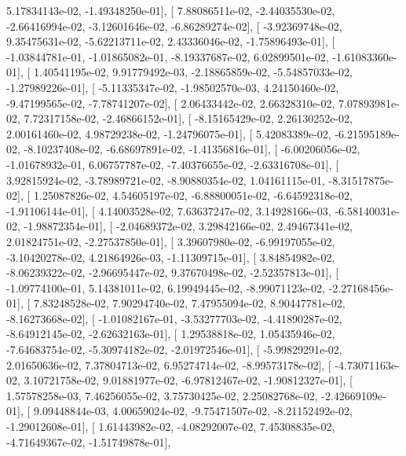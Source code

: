 \documentclass{article}
\begin{document}
          5.17834143e-02,  -1.49348250e-01],
       [  7.88086511e-02,  -2.44035530e-02,  -2.66416994e-02,
         -3.12601646e-02,  -6.86289274e-02],
       [ -3.92369748e-02,   9.35475631e-02,  -5.62213711e-02,
          2.43336046e-02,  -1.75896493e-01],
       [ -1.03844781e-01,  -1.01865082e-01,  -8.19337687e-02,
          6.02899501e-02,  -1.61083360e-01],
       [  1.40541195e-02,   9.91779492e-03,  -2.18865859e-02,
         -5.54857033e-02,  -1.27989226e-01],
       [ -5.11335347e-02,  -1.98502570e-03,   4.24150460e-02,
         -9.47199565e-02,  -7.78741207e-02],
       [  2.06433442e-02,   2.66328310e-02,   7.07893981e-02,
          7.72317158e-02,  -2.46866152e-01],
       [ -8.15165429e-02,   2.26130252e-02,   2.00161460e-02,
          4.98729238e-02,  -1.24796075e-01],
       [  5.42083389e-02,  -6.21595189e-02,  -8.10237408e-02,
         -6.68697891e-02,  -1.41356816e-01],
       [ -6.00206056e-02,  -1.01678932e-01,   6.06757787e-02,
         -7.40376655e-02,  -2.63316708e-01],
       [  3.92815924e-02,  -3.78989721e-02,  -8.90880354e-02,
          1.04161115e-01,  -8.31517875e-02],
       [  1.25087826e-02,   4.54605197e-02,  -6.88800051e-02,
         -6.64592318e-02,  -1.91106144e-01],
       [  4.14003528e-02,   7.63637247e-02,   3.14928166e-03,
         -6.58140031e-02,  -1.98872354e-01],
       [ -2.04689372e-02,   3.29842166e-02,   2.49467341e-02,
          2.01824751e-02,  -2.27537850e-01],
       [  3.39607980e-02,  -6.99197055e-02,  -3.10420278e-02,
          4.21864926e-03,  -1.11309715e-01],
       [  3.84854982e-02,  -8.06239322e-02,  -2.96695447e-02,
          9.37670498e-02,  -2.52357813e-01],
       [ -1.09774100e-01,   5.14381011e-02,   6.19949445e-02,
         -8.99071123e-02,  -2.27168456e-01],
       [  7.83248528e-02,   7.90294740e-02,   7.47955094e-02,
          8.90447781e-02,  -8.16273668e-02],
       [ -1.01082167e-01,  -3.53277703e-02,  -4.41890287e-02,
         -8.64912145e-02,  -2.62632163e-01],
       [  1.29538818e-02,   1.05435946e-02,  -7.64683754e-02,
         -5.30974182e-02,  -2.01972546e-01],
       [ -5.99829291e-02,   2.01650636e-02,   7.37804713e-02,
          6.95274714e-02,  -8.99573178e-02],
       [ -4.73071163e-02,   3.10721758e-02,   9.01881977e-02,
         -6.97812467e-02,  -1.90812327e-01],
       [  1.57578258e-03,   7.46256055e-02,   3.75730425e-02,
          2.25082768e-02,  -2.42669109e-01],
       [  9.09448844e-03,   4.00659024e-02,  -9.75471507e-02,
         -8.21152492e-02,  -1.29012608e-01],
       [  1.61443982e-02,  -4.08292007e-02,   7.45308835e-02,
         -4.71649367e-02,  -1.51749878e-01],
\end{document}
